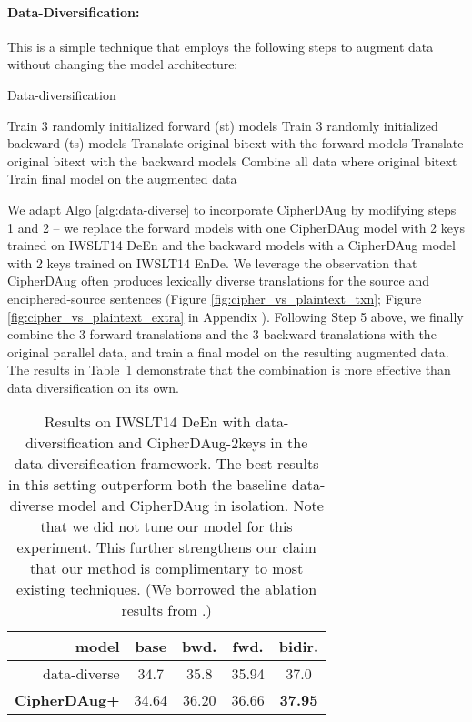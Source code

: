 \documentclass[11pt]{article}
\begin{document}
\paragraph{Data-Diversification:} This is a simple technique that employs the following steps to augment data without changing the model architecture:

\begin{algorithm}
\footnotesize
\caption{Data-diversification}\label{alg:data-diverse}

\begin{algorithmic}[1]
    \State Train 3 randomly initialized forward (st) models
    \State Train 3 randomly initialized backward (ts) models
    \State Translate original bitext with the forward models   
    \State Translate original bitext with the backward models  
    \State Combine all data  where  original bitext
    \State Train final model on the augmented data 
\end{algorithmic}
\end{algorithm}


We adapt Algo \ref{alg:data-diverse} to incorporate CipherDAug by modifying steps 1 and 2 -- we replace the forward models with one CipherDAug model with 2 keys trained on IWSLT14 DeEn and the backward models with a CipherDAug model with 2 keys trained on IWSLT14 EnDe. We leverage the observation that CipherDAug often produces lexically diverse translations for the source and enciphered-source sentences (Figure \ref{fig:cipher_vs_plaintext_txn}; Figure \ref{fig:cipher_vs_plaintext_extra} in Appendix ). Following Step 5 above, we finally combine the 3 forward translations and the 3 backward translations with the original parallel data, and train a final model on the resulting augmented data. The results in Table~\ref{tab:data_diverse_compare} demonstrate that the combination is more effective than data diversification on its own.

\begin{table}[ht]
\small
\centering
\begin{tabular}{rcccc}
\toprule
\textbf{model} & \textbf{base} & \textbf{bwd.} & \textbf{fwd.} & \textbf{bidir.} \\ \midrule
data-diverse & 34.7 & 35.8 & 35.94 & 37.0 \\
\textbf{CipherDAug+} & 34.64 & 36.20 & 36.66 & \textbf{37.95} \\
\bottomrule
\end{tabular}
\caption{Results on IWSLT14 DeEn with data-diversification and CipherDAug-2keys in the data-diversification framework. The best results in this setting outperform both the baseline data-diverse model and CipherDAug in isolation. Note that we did not tune our model for this experiment. This further strengthens our claim that our method is complimentary to most existing techniques. (We borrowed the ablation results from \citet{nguyen19datadiverse}.)}
\label{tab:data_diverse_compare}
\end{table}
\end{document}
